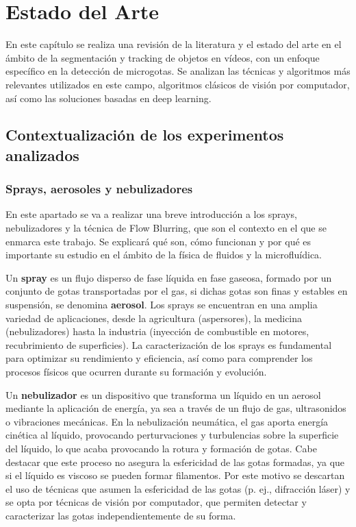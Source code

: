 \chapter{Estado del Arte}\label{cap:estado-del-arte}

En este capítulo se realiza una revisión de la literatura y el estado del arte en el ámbito de la segmentación y tracking de objetos en vídeos, con un enfoque específico en la detección de microgotas. Se analizan las técnicas y algoritmos más relevantes utilizados en este campo, algoritmos clásicos de visión por computador, así como las soluciones basadas en deep learning.

\section {Contextualización de los experimentos analizados}

\subsection{Sprays, aerosoles y nebulizadores}

En este apartado se va a realizar una breve introducción a los sprays, nebulizadores y la técnica de Flow Blurring, que son el contexto en el que se enmarca este trabajo. Se explicará qué son, cómo funcionan y por qué es importante su estudio en el ámbito de la física de fluidos y la microfluídica.

Un \textbf{spray} es un flujo disperso de fase líquida en fase gaseosa, formado por un conjunto de gotas transportadas por el gas, si dichas gotas son finas y estables en suspensión, se denomina \textbf{aerosol}. Los sprays se encuentran en una amplia variedad de aplicaciones, desde la agricultura (aspersores), la medicina (nebulizadores) hasta la industria (inyección de combustible en motores, recubrimiento de superficies). La caracterización de los sprays es fundamental para optimizar su rendimiento y eficiencia, así como para comprender los procesos físicos que ocurren durante su formación y evolución.

Un \textbf{nebulizador} es un dispositivo que transforma un líquido en un aerosol mediante la aplicación de energía, ya sea a través de un flujo de gas, ultrasonidos o vibraciones mecánicas. En la nebulización neumática, el gas aporta energía cinética al líquido, provocando perturvaciones y turbulencias sobre la superficie del líquido, lo que acaba provocando la rotura y formación de gotas. Cabe destacar que este proceso no asegura la esfericidad de las gotas formadas, ya que si el líquido es viscoso se pueden formar filamentos. Por este motivo se descartan el uso de técnicas que asumen la esfericidad de las gotas (p. ej., difracción láser) y se opta por técnicas de visión por computador, que permiten detectar y caracterizar las gotas independientemente de su forma.

